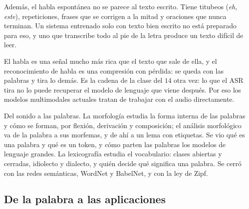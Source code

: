 \documentclass[11pt,letterpaper]{article}
\begin{document}
Además, el habla espontánea no se parece al texto escrito. Tiene
titubeos (\textit{eh}, \textit{este}), repeticiones, frases que se
corrigen a la mitad y oraciones que nunca terminan. Un sistema
entrenado solo con texto bien escrito no está preparado para eso, y
uno que transcribe todo al pie de la letra produce un texto difícil de
leer.

\begin{idea}
    El habla es una señal mucho más rica que el texto que sale de ella,
    y el reconocimiento de habla es una compresión con pérdida: se
    queda con las palabras y tira lo demás. Es la cadena de la clase
    del $14$ otra vez: lo que el ASR tira no lo puede recuperar el
    modelo de lenguaje que viene después. Por eso los modelos
    multimodales actuales tratan de trabajar con el audio directamente.
\end{idea}


\newpage


\begin{quick_sum}
    Del sonido a las palabras. La morfología estudia la forma interna
    de las palabras y cómo se forman, por flexión, derivación y
    composición; el análisis morfológico va de la palabra a sus
    morfemas, y de ahí a un lema con etiquetas. Se vio qué es una
    palabra y qué es un token, y cómo parten las palabras los modelos
    de lenguaje grandes. La lexicografía estudia el vocabulario: clases
    abiertas y cerradas, idiolecto y dialecto, y quién decide qué
    significa una palabra. Se cerró con las redes semánticas, WordNet y
    BabelNet, y con la ley de Zipf.
\end{quick_sum}

\subsection*{De la palabra a las aplicaciones}
\end{document}
